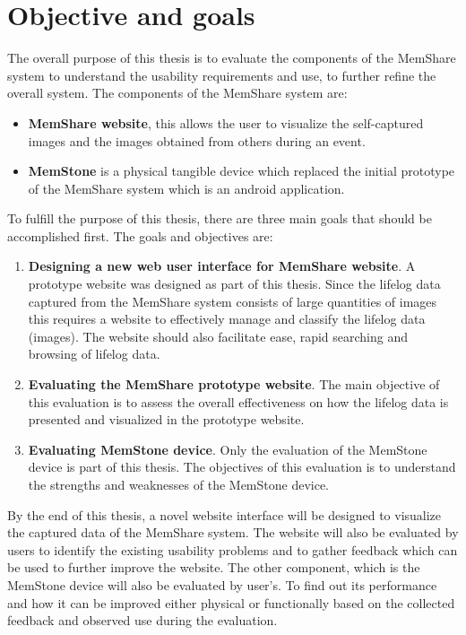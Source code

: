 \documentclass[mscthesis]{usiinfthesis}
\begin{document}
\section{Objective and goals}
\label{obj}
The overall purpose of this thesis is to evaluate the components of the MemShare system to understand the usability requirements and use, to further refine the overall system. The components of the MemShare system are:
\begin{itemize}
\item \textbf{MemShare website}, this allows the user to visualize the self-captured images and the images obtained from others during an event. 
\item \textbf{MemStone} is a physical tangible device which replaced the initial prototype of the MemShare system which is an android application. 
\end{itemize}

To fulfill the purpose of this thesis, there are three main goals that should be accomplished first. The goals and objectives are:
\begin{enumerate}

\item \textbf{Designing a new web user interface for MemShare website}. A prototype website was designed as part of this thesis. Since the lifelog data captured from the MemShare system consists of large quantities of images this requires a website to effectively manage and classify the lifelog data (images). The website should also facilitate ease, rapid searching and browsing of lifelog data.

   \item \textbf{Evaluating the MemShare prototype website}. The main objective of this evaluation is to assess the overall effectiveness on how the lifelog data is presented and visualized in the prototype website. 
   \item \textbf{Evaluating MemStone device}. Only the evaluation of the MemStone device is part of this thesis. The objectives of this evaluation is to understand the strengths and weaknesses of the MemStone device. 
\end{enumerate}

By the end of this thesis, a novel website interface will be designed to visualize the captured data of the MemShare system. The website will also be evaluated by users to identify the existing usability problems and to gather feedback which can be used to further improve the website. The other component, which is the MemStone device will also be evaluated by user's. To find out its performance and how it can be improved either physical or functionally based on the collected feedback and observed use during the evaluation.
\end{document}

